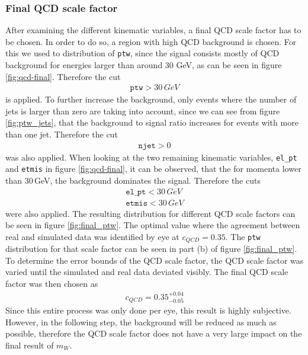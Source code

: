 \subsubsection{Final QCD scale factor}
    \label{sec:final_qcd}
    After examining the different kinematic variables, a final QCD scale factor has to be chosen.
    In order to do so, a region with high QCD background is chosen. For this we used to distribution of \texttt{ptw}, since the signal consists mostly of QCD background
    for energies larger than around 30 GeV, as can be seen in figure \ref{fig:qcd-final}. Therefore the cut
    \begin{align*}
        \texttt{ptw} > 30\,GeV
    \end{align*}
    is applied. To further increase the background, only events where the number of jets is larger than zero are taking into account, since we can see from
    figure \ref{fig:ptw_jets}, that the background to signal ratio increases for events with more than one jet. Therefore the cut 
    \begin{align*}
        \texttt{njet} > 0
    \end{align*}
    was also applied. When looking at the two remaining kinematic variables, \texttt{el\_pt} and \texttt{etmis} in figure \ref{fig:qcd-final}, it can be observed, that
    the for momenta lower than 30\,GeV, the background dominates the signal.
    Therefore the cuts 
    \begin{align*}
        \texttt{el\_pt} < 30\, GeV \\
        \texttt{etmis} < 30\, GeV
    \end{align*}
    were also applied. The resulting distribution for different QCD scale factors can be seen in figure \ref{fig:final_ptw}.
    The optimal value where the agreement between real and simulated data was identified by eye at $c_{QCD}=0.35$. The \texttt{ptw} distribution for that scale factor can 
    be seen in part (b) of figure \ref{fig:final_ptw}.
    To determine the error bounds of the QCD scale factor, the QCD scale factor was varied until the simulated and real data deviated visibly.
    The final QCD scale factor was then chosen as 
    \begin{align*}
        c_{QCD} = 0.35_{-0.05}^{+0.04} 
    \end{align*}
    Since this entire process was only done per eye, this result is highly subjective. However, in the following step, the background will be reduced as much as possible,
    therefore the QCD scale factor does not have a very large impact on the final result of $m_W$. 
